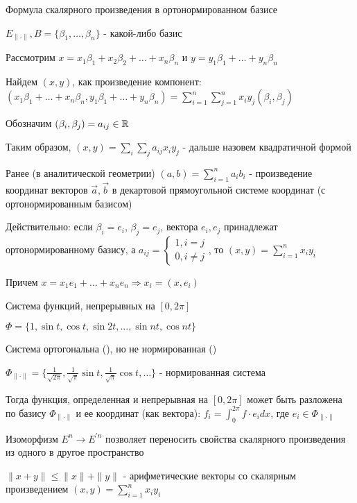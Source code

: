 \documentclass[12pt]{article}
\begin{document}
    \Ex Формула скалярного произведения в ортонормированном базисе

    $E_{\|\cdot\|}, B = \{\beta_1, \dots, \beta_n\}$ - какой-либо базис

    Рассмотрим $x = x_1 \beta_1 + x_2 \beta_2 + \dots + x_n \beta_n$ и $y = y_1 \beta_1 + \dots + y_n \beta_n$

    Найдем $(x, y)$, как произведение компонент: $(x_1 \beta_1 + \dots + x_n \beta_n, y_1 \beta_1 + \dots + y_n \beta_n) = \sum_{i = 1}^n \sum_{j = 1}^n x_i y_j (\beta_i, \beta_j)$

    Обозначим $(\beta_i, \beta_j) = a_{ij} \in \mathbb{R}$

    Таким образом, $(x, y) = \sum_i \sum_j a_{ij} x_i y_j$ - дальше назовем квадратичной формой

    Ранее (в аналитической геометрии) $(a, b) = \sum_{i = 1}^n a_i b_i$ - произведение координат векторов $\vec{a}, \vec{b}$ в
    декартовой прямоугольной системе координат (с ортонормированным базисом)

    Действительно: если $\beta_i = e_i$, $\beta_j = e_j$, вектора $e_i, e_j$ принадлежат ортонормированному базису, 
    а $a_{ij} = \begin{cases}1, i = j \\ 0, i \neq j\end{cases}$, то $(x, y) = \sum_{i = 1}^n x_i y_i$

    Причем $x = x_1 e_1 + \dots + x_n e_n \Longrightarrow x_i = (x, e_i)$

    \Ex Система функций, непрерывных на $[0, 2\pi]$

    $\Phi = \{1, \sin t, \cos t, \sin 2t, \dots, \sin nt, \cos nt\}$

    Система ортогональна (\Lab), но не нормированная (\Lab)

    $\Phi_{\|\cdot\|} = \{\frac{1}{\sqrt{2\pi}}, \frac{1}{\sqrt{\pi}}\sin t, \frac{1}{\sqrt{\pi}} \cos t, \dots\}$ - нормированная система

    Тогда функция, определенная и непрерывная на $[0, 2\pi]$ может быть разложена по базису $\Phi_{\|\cdot\|}$
    и ее координат (как вектора): $f_i = \int_0^{2\pi} f \cdot e_i dx$, где $e_i \in \Phi_{\|\cdot\|}$


    \Nota Изоморфизм $E^n \rightarrow E^{\prime n}$ позволяет переносить свойства скалярного произведения
    из одного в другое пространство

    \Ex $\|x + y\| \leq \|x\| + \|y\|$ - арифметические векторы со скалярным произведением $(x, y) = \sum^n_{i = 1} x_i y_i$
\end{document}
